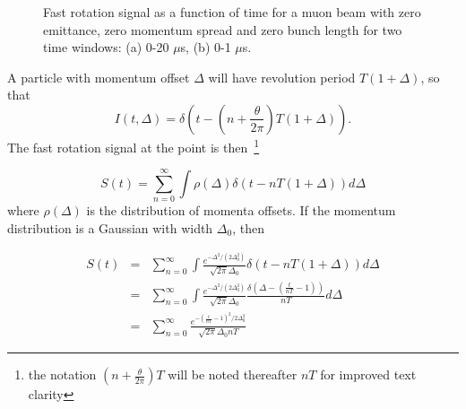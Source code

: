 \begin{figure}[bt]
\centering
{}
\caption{Fast rotation signal as a function of time for a muon beam with zero emittance, zero momentum spread and zero bunch length for two time windows: (a) 0-20 $\mu$s, (b) 0-1 $\mu$s.}
\label{fig:perfect_frs}
\end{figure}
 
A particle with momentum offset $\Delta$ will have revolution period $T(1+\Delta)$, so that 
\begin{equation}
I(t,\Delta)=\delta\left(t-\left(n+\frac{\theta}{2\pi}\right)T\left(1+\Delta\right)\right). 
\end{equation}
The fast rotation signal at the point is then~\footnote{the notation $(n+\frac{\theta}{2\pi})T$ will be noted thereafter $nT$ for improved text clarity} 

\begin{equation}
S(t)=\sum^{\infty}_{n=0}\int\rho(\Delta)\delta\left(t-nT\left(1+\Delta\right)\right)d\Delta 
\end{equation}
where $\rho(\Delta)$ is the distribution of momenta offsets. If the momentum distribution is a Gaussian with width $\Delta_0$, then 

\begin{eqnarray}
S(t) &=& \sum^{\infty}_{n=0}\int\frac{e^{-\Delta^2/(2\Delta^2_0)}}{\sqrt{2\pi}\Delta_0}
\delta\left(t-nT\left(1+\Delta\right)\right)d\Delta\\
&=&\sum^{\infty}_{n=0}\int\frac{e^{-\Delta^2/(2\Delta^2_0)}}{\sqrt{2\pi}\Delta_0}\frac{\delta\left(\Delta-\left(\frac{t}{nT}-1\right)\right)}{nT}d\Delta\\
&=&\sum^{\infty}_{n=0}\frac{e^{-(\frac{t}{nT}-1)^2/2\Delta^2_0}}{\sqrt{2\pi}\Delta_0nT}\label{eq:Espread_frs}
\end{eqnarray}

